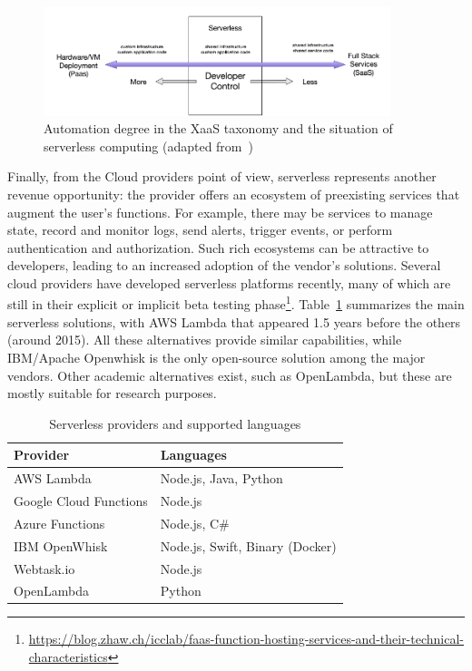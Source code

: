 \begin{figure}[tbp]
	\includegraphics[width=0.9\textwidth]{figs/DeveloperControl.png}
	\caption{Automation degree in the XaaS taxonomy and the situation of serverless computing (adapted from~\cite{baldini2017serverless})}
	\label{fig:developer-control-serverless}
\end{figure}


Finally, from the Cloud providers point of view, serverless represents another revenue opportunity: the provider offers an ecosystem of preexisting services that augment the user's functions. For example, there may be services to manage state, record and monitor logs, send alerts, trigger events, or perform authentication and authorization. Such rich ecosystems can be attractive to developers, leading to an increased adoption of the vendor's solutions. Several cloud providers have developed serverless platforms recently, many of which are still in their explicit or implicit beta testing phase\footnote{\url{https://blog.zhaw.ch/icclab/faas-function-hosting-services-and-their-technical-characteristics}}. Table~\ref{tab:FaaS-providers-and} summarizes the main serverless solutions, with AWS Lambda that appeared 1.5 years before the others (around 2015). All these alternatives provide similar capabilities, while IBM/Apache Openwhisk is the only open-source solution among the major vendors. Other academic alternatives exist, such as OpenLambda\cite{hendrickson2016serverless}, but these are mostly suitable for research purposes.

\begin{table}[hbt]
\centering
\caption{Serverless providers and supported languages\label{tab:FaaS-providers-and}}{
\begin{tabular}{ll}
\toprule 
\textbf{Provider} & \textbf{Languages}\tabularnewline
\midrule
AWS Lambda & Node.js, Java, Python\tabularnewline
Google Cloud Functions & Node.js\tabularnewline
Azure Functions & Node.js, C\#\tabularnewline
IBM OpenWhisk & Node.js, Swift, Binary (Docker)\tabularnewline
Webtask.io & Node.js\tabularnewline
OpenLambda & Python\tabularnewline
\bottomrule
\end{tabular}}
\end{table}

